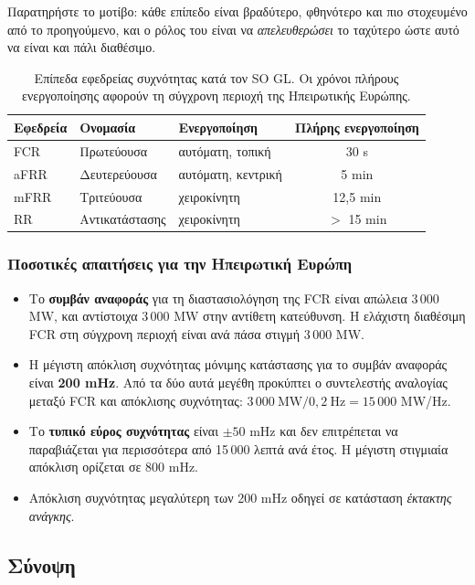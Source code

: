 Παρατηρήστε το μοτίβο: κάθε επίπεδο είναι βραδύτερο, φθηνότερο και πιο στοχευμένο από το
προηγούμενο, και ο ρόλος του είναι να \emph{απελευθερώσει} το ταχύτερο ώστε αυτό να είναι
και πάλι διαθέσιμο.

\begin{table}[!htbp]
\centering
\begin{tabular}{lllc}
\hline
Εφεδρεία & Ονομασία & Ενεργοποίηση & Πλήρης ενεργοποίηση \\
\hline
FCR  & Πρωτεύουσα   & αυτόματη, τοπική  & 30 s \\
aFRR & Δευτερεύουσα & αυτόματη, κεντρική & 5 min \\
mFRR & Τριτεύουσα   & χειροκίνητη        & 12,5 min \\
RR   & Αντικατάστασης & χειροκίνητη      & $>$ 15 min \\
\hline
\end{tabular}
\caption{Επίπεδα εφεδρείας συχνότητας κατά τον SO GL. Οι χρόνοι πλήρους ενεργοποίησης
αφορούν τη σύγχρονη περιοχή της Ηπειρωτικής Ευρώπης.}
\label{tab:reserves}
\end{table}

\subsubsection*{Ποσοτικές απαιτήσεις για την Ηπειρωτική Ευρώπη}

\begin{itemize}
\item Το \textbf{συμβάν αναφοράς} για τη διαστασιολόγηση της FCR είναι απώλεια
      3\,000 MW, και αντίστοιχα 3\,000 MW στην αντίθετη κατεύθυνση. Η ελάχιστη διαθέσιμη FCR
      στη σύγχρονη περιοχή είναι ανά πάσα στιγμή 3\,000 MW.
\item Η μέγιστη απόκλιση συχνότητας μόνιμης κατάστασης για το συμβάν αναφοράς είναι
      \textbf{200 mHz}. Από τα δύο αυτά μεγέθη προκύπτει ο συντελεστής αναλογίας μεταξύ FCR
      και απόκλισης συχνότητας: $3\,000\ \text{MW} / 0{,}2\ \text{Hz} = 15\,000$ MW/Hz.
\item Το \textbf{τυπικό εύρος συχνότητας} είναι $\pm 50$ mHz και δεν επιτρέπεται να
      παραβιάζεται για περισσότερα από 15\,000 λεπτά ανά έτος. Η μέγιστη στιγμιαία απόκλιση
      ορίζεται σε 800 mHz.
\item Απόκλιση συχνότητας μεγαλύτερη των 200 mHz οδηγεί σε κατάσταση \emph{έκτακτης ανάγκης}.
\end{itemize}

\subsection{Σύνοψη}

